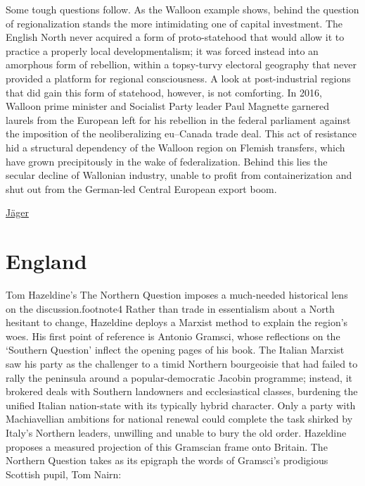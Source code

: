 \documentclass[
]{book}
\begin{document}
Some tough questions follow. As the Walloon example shows, behind the question of regionalization stands the more intimidating one of capital investment. The English North never acquired a form of proto-statehood that would allow it to practice a properly local developmentalism; it was forced instead into an amorphous form of rebellion, within a topsy-turvy electoral geography that never provided a platform for regional consciousness. A look at post-industrial regions that did gain this form of statehood, however, is not comforting. In 2016, Walloon prime minister and Socialist Party leader Paul Magnette garnered laurels from the European left for his rebellion in the federal parliament against the imposition of the neoliberalizing eu--Canada trade deal. This act of resistance hid a structural dependency of the Walloon region on Flemish transfers, which have grown precipitously in the wake of federalization. Behind this lies the secular decline of Wallonian industry, unable to profit from containerization and shut out from the German-led Central European export boom.

\href{https://newleftreview.org/issues/ii128/articles/anton-jager-rebel-regions}{Jäger}

\hypertarget{england}{%
\chapter{England}\label{england}}

Tom Hazeldine's The Northern Question imposes a much-needed historical lens on the discussion.footnote4 Rather than trade in essentialism about a North hesitant to change, Hazeldine deploys a Marxist method to explain the region's woes. His first point of reference is Antonio Gramsci, whose reflections on the `Southern Question' inflect the opening pages of his book. The Italian Marxist saw his party as the challenger to a timid Northern bourgeoisie that had failed to rally the peninsula around a popular-democratic Jacobin programme; instead, it brokered deals with Southern landowners and ecclesiastical classes, burdening the unified Italian nation-state with its typically hybrid character. Only a party with Machiavellian ambitions for national renewal could complete the task shirked by Italy's Northern leaders, unwilling and unable to bury the old order. Hazeldine proposes a measured projection of this Gramscian frame onto Britain. The Northern Question takes as its epigraph the words of Gramsci's prodigious Scottish pupil, Tom Nairn:
\end{document}
